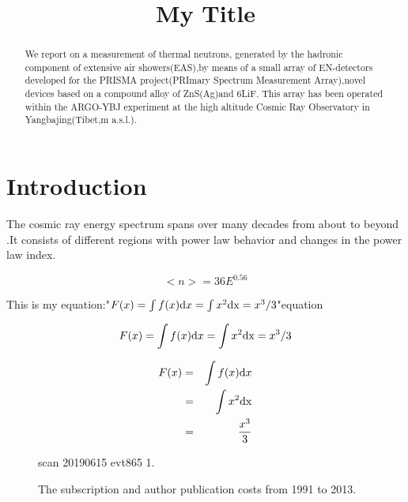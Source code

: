 \documentclass{aastex62}
\begin{document}
\title{My Title}

\begin{abstract}
We report on a measurement of thermal neutrons, generated by the hadronic component of extensive air showers(EAS),by means of a small array of EN-detectors developed for the PRISMA project(PRImary Spectrum Measurement Array),novel devices based on a compound alloy of ZnS(Ag)and 6LiF. This array has been operated within the ARGO-YBJ experiment at the high altitude Cosmic Ray Observatory in Yangbajing(Tibet,m a.s.l.). 
\end{abstract}


\section{Introduction}

The cosmic ray energy spectrum spans over many decades from about to beyond .It consists of different regions with power law behavior and changes in the power law index.


\begin{equation}
<n>=36 E^{0.56}
\end{equation}

This is my equation:"$F(x)=\int f(x) {\rm d}x = \int x^2 {\rm d x}=x^3/3$"equation

\begin{equation}
F(x)= \int f(x) {\rm d}x = \int x^2 {\rm d x}=x^3/3
\end{equation}

\begin{eqnarray}
F(x) &=&\int f(x) {\rm d}x \\
&=& \int x^2 {\rm d x} \nonumber\\
&=&x^3 \over 3
\end{eqnarray}


\begin{figure}[ht!]
\caption{scan 20190615 evt865 1.}
\end{figure}


\begin{figure}[ht!]
\caption{The subscription and author publication costs from 1991 to 2013.}
\end{figure}
\end{document}
